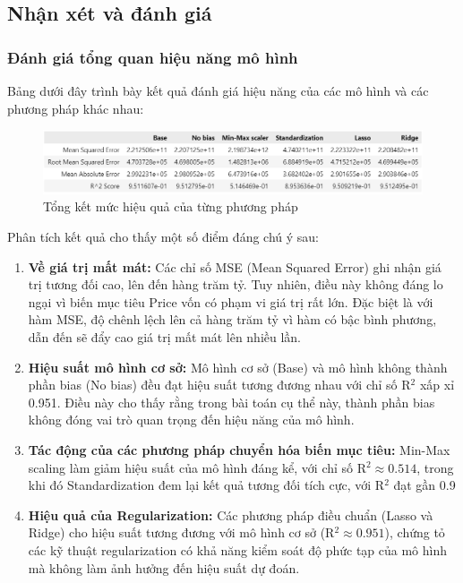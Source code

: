 \subsection{Nhận xét và đánh giá}
\subsubsection{Đánh giá tổng quan hiệu năng mô hình}

Bảng dưới đây trình bày kết quả đánh giá hiệu năng của các mô hình và các phương pháp khác nhau:

\begin{figure}[H]
    \centering
    \includegraphics[width=1\linewidth]{img_multiple/summary.png}
    \caption{Tổng kết mức hiệu quả của từng phương pháp}
    \label{fig:summary}
\end{figure}

Phân tích kết quả cho thấy một số điểm đáng chú ý sau:

\begin{enumerate}
    \item \textbf{Về giá trị mất mát:} Các chỉ số MSE (Mean Squared Error) ghi nhận giá trị tương đối cao, lên đến hàng trăm tỷ. Tuy nhiên, điều này không đáng lo ngại vì biến mục tiêu Price vốn có phạm vi giá trị rất lớn. Đặc biệt là với hàm MSE, độ chênh lệch lên cả hàng trăm tỷ vì hàm có bậc bình phương, dẫn đến sẽ đẩy cao giá trị mất mát lên nhiều lần.
    
    \item \textbf{Hiệu suất mô hình cơ sở:} Mô hình cơ sở (Base) và mô hình không thành phần bias (No bias) đều đạt hiệu suất tương đương nhau với chỉ số R$^2$ xấp xỉ 0.951. Điều này cho thấy rằng trong bài toán cụ thể này, thành phần bias không đóng vai trò quan trọng đến hiệu năng của mô hình.
    
    \item \textbf{Tác động của các phương pháp chuyển hóa biến mục tiêu:} Min-Max scaling làm giảm hiệu suất của mô hình đáng kể, với chỉ số R$^2 \approx 0.514$, trong khi đó Standardization đem lại kết quả tương đối tích cực, với R$^2$ đạt gần 0.9
    
    \item \textbf{Hiệu quả của Regularization:} Các phương pháp điều chuẩn (Lasso và Ridge) cho hiệu suất tương đương với mô hình cơ sở (R$^2 \approx 0.951$), chứng tỏ các kỹ thuật regularization có khả năng kiểm soát độ phức tạp của mô hình mà không làm ảnh hưởng đến hiệu suất dự đoán.
\end{enumerate}

